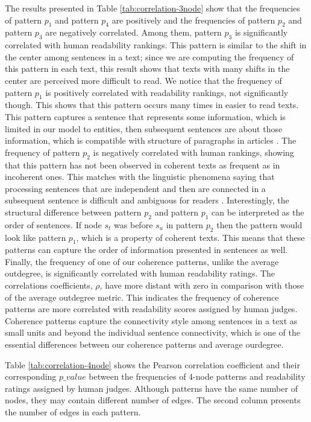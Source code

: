 The results presented in Table \ref{tab:correlation-3node} show that the frequencies of pattern $p_1$ and pattern $p_4$ are positively and the frequencies of pattern $p_2$ and pattern $p_3$ are negatively correlated. 
Among them, pattern $p_3$ is significantly correlated with human readability rankings. 
This pattern is similar to the shift in the center among sentences in a text; since we are computing the frequency of this pattern in each text, this result shows that texts with many shifts in the center are perceived more difficult to read. 
We notice that the frequency of pattern $p_1$ is positively correlated with readability rankings, not significantly though. 
This shows that this pattern occurs many times in easier to read texts.  
This pattern captures a sentence that represents some information, which is limited in our model to entities, then  subsequent sentences are about those information, which is compatible with structure of paragraphs in articles \cite{}.  
The frequency of pattern $p_2$ is negatively correlated with human rankings, showing that this pattern has not been observed in coherent texts as frequent as in incoherent ones. 
This matches with the linguistic phenomena saying that processing sentences that are independent and then are connected in a subsequent sentence is difficult and ambiguous for readers \cite{}. 
Interestingly, the structural difference between pattern $p_2$ and pattern $p_1$ can be interpreted as the order of sentences. 
If node $s_t$ was before $s_u$ in pattern $p_2$ then the pattern would look like pattern $p_1$, which is a property of coherent texts. 
This means that these patterns can capture the order of information presented in sentences as well. 
Finally, the frequency of one of our coherence patterns, unlike the average outdegree, is significantly correlated with human readability ratings. 
The correlations coefficients, $\rho$, have more distant with zero in comparison with those of the average outdegree metric. 
This indicates the frequency of coherence patterns are more correlated with readability scores assigned by human judges. 
Coherence patterns capture the connectivity style among sentences in a text as small units and beyond the individual  sentence connectivity, which is one of the essential differences between our coherence patterns and average ourdegree. 

Table \ref{tab:correlation-4node} shows the Pearson correlation coefficient and their corresponding $p\_value$ between the frequencies of 4-node patterns and readability ratings assigned by human judges. 
Although patterns have the same number of nodes, they may contain different number of edges. 
The second column presents the number of edges in each pattern. 

